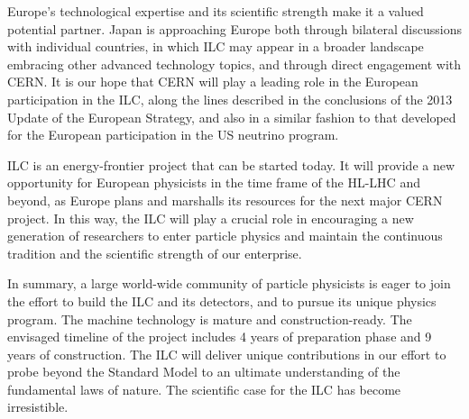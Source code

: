 \documentclass[%
 reprint,
 amsmath,amssymb,
 aps,
]{revtex4-1}
\begin{document}
 Europe's technological expertise and its scientific strength make it
 a valued potential partner.   Japan is approaching Europe both
 through
bilateral discussions with individual countries, in which  ILC may
 appear in a broader landscape embracing other advanced technology
 topics, and through direct engagement with CERN. 
It is our hope  that CERN will play a leading
role in the European participation in the ILC, along the lines
described in the 
conclusions of the 2013 Update of the European Strategy, and also in a
similar fashion to that  developed for the European participation
in the US  neutrino program.  

ILC is an energy-frontier project that
can be started today.   It will provide a new opportunity for European
physicists in the time frame of the HL-LHC and beyond, as Europe plans
and marshalls its resources for the next major CERN project. In this 
way, the ILC will play a crucial role in encouraging a new
generation of researchers to enter particle physics and maintain the
continuous tradition and the scientific strength of our enterprise.

In summary, a large world-wide community of particle physicists is eager to join the effort to build the ILC and its detectors, and to pursue its unique 
physics program. The machine technology is mature and construction-ready. The
envisaged timeline of the project includes 4 years of preparation
phase and 9 years of construction. The ILC will deliver unique contributions in our effort to probe beyond the Standard Model to an ultimate understanding
of the fundamental laws of nature. The scientific case for the ILC
has become irresistible.


\end{document}
